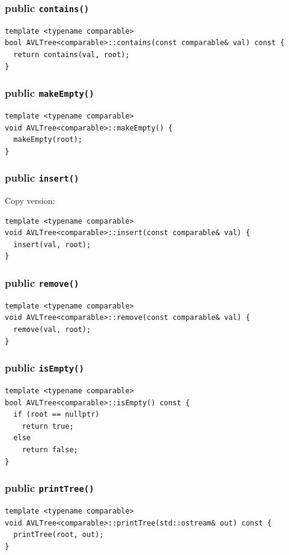 \documentclass[12pt]{book}
\begin{document}
\subsubsection{public \texttt{contains()}}
\label{sec:org6e1fd01}
\begin{verbatim}
template <typename comparable>
bool AVLTree<comparable>::contains(const comparable& val) const {
  return contains(val, root);
}
\end{verbatim}
\subsubsection{public \texttt{makeEmpty()}}
\label{sec:orgf6fe61e}
\begin{verbatim}
template <typename comparable>
void AVLTree<comparable>::makeEmpty() {
  makeEmpty(root);
}
\end{verbatim}
\subsubsection{public \texttt{insert()}}
\label{sec:orga6e1800}
Copy version:
\begin{verbatim}
template <typename comparable>
void AVLTree<comparable>::insert(const comparable& val) {
  insert(val, root);
}
\end{verbatim}
\subsubsection{public \texttt{remove()}}
\label{sec:org80b99ed}
\begin{verbatim}
template <typename comparable>
void AVLTree<comparable>::remove(const comparable& val) {
  remove(val, root);
}
\end{verbatim}
\subsubsection{public \texttt{isEmpty()}}
\label{sec:org9d72a76}
\begin{verbatim}
template <typename comparable>
bool AVLTree<comparable>::isEmpty() const {
  if (root == nullptr)
    return true;
  else 
    return false;
}
\end{verbatim}
\subsubsection{public \texttt{printTree()}}
\label{sec:org813484b}
\begin{verbatim}
template <typename comparable>
void AVLTree<comparable>::printTree(std::ostream& out) const {
  printTree(root, out);
}
\end{verbatim}
\end{document}
